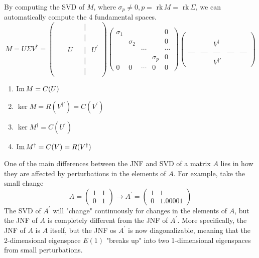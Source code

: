   By computing the SVD of $M$, where $\sigma_p \neq 0, p =$ rk$\,M = $ rk$\,\Sigma$, we can automatically compute the 4 fundamental spaces. 
  \begin{equation}
    M = U \Sigma V^\dagger = \begin{pmatrix}&&&&|&\\&&&&|&\\&&U&&|&U^\prime\\&&&&|&\\&&&&|&
    \end{pmatrix} \begin{pmatrix}
    \sigma_1&&&&0\\
    &\sigma_2&&&0\\
    &&\cdots&&\cdots\\
    &&&\sigma_p&0\\
    0&0&\cdots&0&0
    \end{pmatrix}\begin{pmatrix}
    &&&&\\&&&&\\&&V^\dagger&&\\&&&&\\\text{---}&\text{---}&\text{---}&\text{---}&\text{---}
    \\&&V^{\dagger \prime}&&
    \end{pmatrix}
  \end{equation}
  \begin{enumerate}
    \item $\operatorname{Im}{M} = C(U)$
    \item $\ker{M} = R(V^{\dagger \prime}) = C(V^\prime)$
    \item $\ker{M^\dagger} = C(U^\prime)$
    \item $\operatorname{Im}{M^\dagger} = C(V) = R(V^\dagger)$
  \end{enumerate}

  One of the main differences between the JNF and SVD of a matrix $A$ lies in how they are affected by perturbations in the elements of $A$. For example, take the small change 
  \begin{equation}
    A = \begin{pmatrix}
    1 & 1\\
    0 & 1
    \end{pmatrix} \longrightarrow A^\prime  = \begin{pmatrix}
    1 & 1 \\
    0 & 1.00001
    \end{pmatrix}
  \end{equation}
  The SVD of $A^\prime$ will "change" continuously for changes in the elements of $A$, but the JNF of $A$ is completely different from the JNF of $A^\prime$. More specifically, the JNF of $A$ is $A$ itself, but the JNF os $A^\prime$ is now diagonalizable, meaning that the 2-dimensional eigenspace $E(1)$ "breaks up" into two 1-dimensional eigenspaces from small perturbations. 

